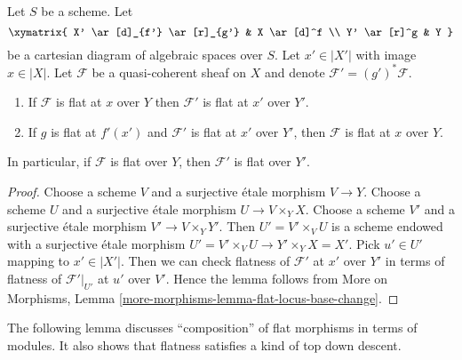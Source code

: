 \begin{lemma}
\label{lemma-base-change-module-flat}
Let $S$ be a scheme. Let
$$
\xymatrix{
X' \ar[d]_{f'} \ar[r]_{g'} & X \ar[d]^f \\
Y' \ar[r]^g & Y
}
$$
be a cartesian diagram of algebraic spaces over $S$. Let $x' \in |X'|$
with image $x \in |X|$. Let $\mathcal{F}$ be a quasi-coherent
sheaf on $X$ and denote $\mathcal{F}' = (g')^*\mathcal{F}$.
\begin{enumerate}
\item If $\mathcal{F}$ is flat at $x$ over $Y$
then $\mathcal{F}'$ is flat at $x'$ over $Y'$.
\item If $g$ is flat at $f'(x')$ and
$\mathcal{F}'$ is flat at $x'$ over $Y'$, then
$\mathcal{F}$ is flat at $x$ over $Y$.
\end{enumerate}
In particular, if $\mathcal{F}$ is flat over $Y$, then
$\mathcal{F}'$ is flat over $Y'$.
\end{lemma}

\begin{proof}
Choose a scheme $V$ and a surjective \'etale morphism $V \to Y$.
Choose a scheme $U$ and a surjective \'etale morphism $U \to V \times_Y X$.
Choose a scheme $V'$ and a surjective \'etale morphism $V' \to V \times_Y Y'$.
Then $U' = V' \times_V U$ is a scheme endowed with a surjective \'etale
morphism $U' = V' \times_V U \to Y' \times_Y X = X'$. Pick $u' \in U'$
mapping to $x' \in |X'|$. Then we can check flatness of
$\mathcal{F}'$ at $x'$ over $Y'$ in terms of flatness of
$\mathcal{F}'|_{U'}$ at $u'$ over $V'$. Hence the lemma follows from
More on Morphisms, Lemma \ref{more-morphisms-lemma-flat-locus-base-change}.
\end{proof}

\noindent
The following lemma discusses ``composition'' of flat morphisms in
terms of modules. It also shows that flatness satisfies a kind of
top down descent.


